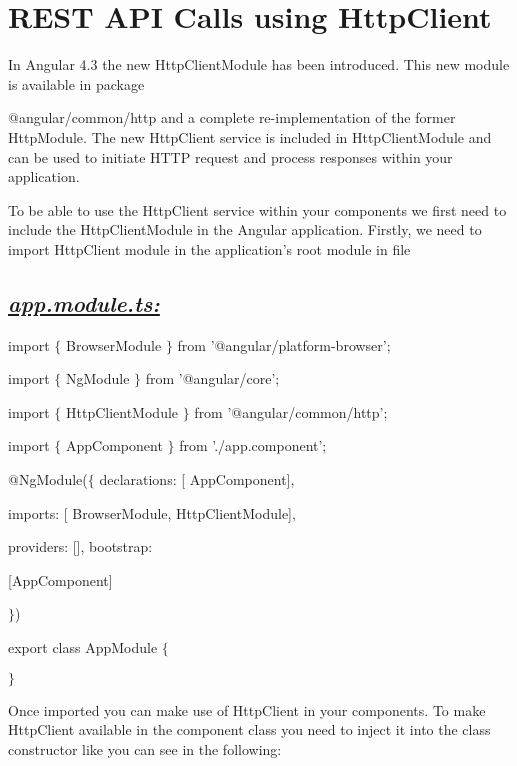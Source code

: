 \documentclass[11pt,twoside]{article}
\begin{document}
\section*{REST API Calls using HttpClient}

In Angular 4.3 the new HttpClientModule has been introduced. This new module is available in package

@angular/common/http and a complete re-implementation of the former HttpModule. The new HttpClient service is included in HttpClientModule and can be used to initiate HTTP request and process responses within your application.

\vspace{1\baselineskip}
To be able to use the HttpClient service within your components we first need to include the HttpClientModule in the Angular application. Firstly, we need to import HttpClient module in the application's root module in file 

\vspace{1\baselineskip}
\subsection*{{\textit{\uline{app.module.ts:}}}}

\vspace{1\baselineskip}
import $\{$ BrowserModule $\}$ from '@angular/platform-browser'; 

import $\{$ NgModule $\}$ from '@angular/core'; 

import $\{$ HttpClientModule $\}$ from '@angular/common/http'; 

import $\{$ AppComponent $\}$ from './app.component'; 

\vspace{1\baselineskip}
@NgModule($\{$ declarations: [ AppComponent],

imports: [ BrowserModule, HttpClientModule],

providers: [], bootstrap: 

[AppComponent]

$\}$)

\vspace{1\baselineskip}
export class AppModule $\{$ 

\vspace{1\baselineskip}
$\}$

\vspace{2\baselineskip}
Once imported you can make use of HttpClient in your components. To make HttpClient available in the component class you need to inject it into the class constructor like you can see in the following:
\end{document}
